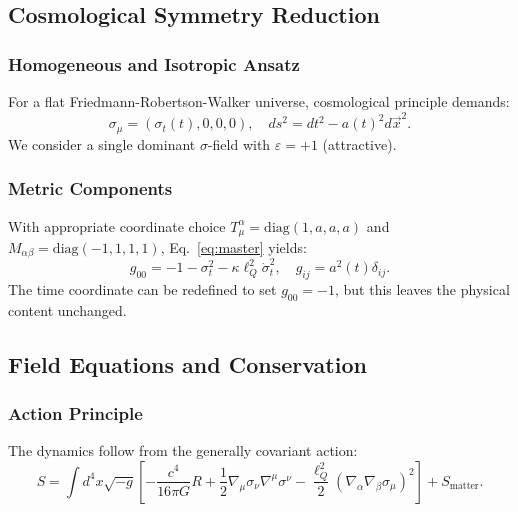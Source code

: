 \documentclass[11pt,a4paper]{article}
\theoremstyle{definition}
\theoremstyle{remark}
\begin{document}
	\subsection{Cosmological Symmetry Reduction}
	
	\subsubsection{Homogeneous and Isotropic Ansatz}
	For a flat Friedmann-Robertson-Walker universe, cosmological principle demands:
	\begin{equation}
		\sigma_\mu = (\sigma_t(t), 0, 0, 0), \quad ds^2 = dt^2 - a(t)^2 d\vec{x}^2.
		\label{eq:ansatz}
	\end{equation}
	We consider a single dominant $\sigma$-field with $\varepsilon = +1$ (attractive).
	
	\subsubsection{Metric Components}
	With appropriate coordinate choice $T^\alpha_\mu = \text{diag}(1, a, a, a)$ and $M_{\alpha\beta} = \text{diag}(-1, 1, 1, 1)$, Eq.~\eqref{eq:master} yields:
	\begin{equation}
		g_{00} = -1 - \sigma_t^2 - \kappa \ell_Q^2 \dot{\sigma}_t^2, \quad g_{ij} = a^2(t) \delta_{ij}.
		\label{eq:metric_components}
	\end{equation}
	The time coordinate can be redefined to set $g_{00} = -1$, but this leaves the physical content unchanged.
	
	\subsection{Field Equations and Conservation}
	
	\subsubsection{Action Principle}
	The dynamics follow from the generally covariant action:
	\begin{equation}
		S = \int d^4x \sqrt{-g} \left[ -\frac{c^4}{16\pi G} R + \frac{1}{2} \nabla_\mu \sigma_\nu \nabla^\mu \sigma^\nu - \frac{\ell_Q^2}{2} (\nabla_\alpha \nabla_\beta \sigma_\mu)^2 \right] + S_{\text{matter}}.
		\label{eq:action}
	\end{equation}
	
\end{document}
